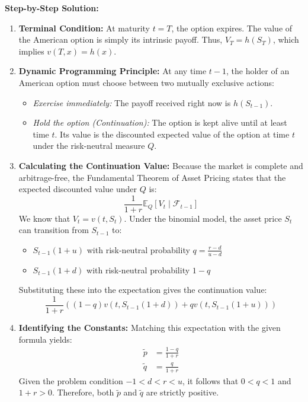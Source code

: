 \textbf{Step-by-Step Solution:}
\begin{enumerate}
    \item \textbf{Terminal Condition:} At maturity $t=T$, the option expires. The value of the American option is simply its intrinsic payoff. Thus, $V_T = h(S_T)$, which implies $v(T, x) = h(x)$.
    
    \item \textbf{Dynamic Programming Principle:} At any time $t-1$, the holder of an American option must choose between two mutually exclusive actions:
    \begin{itemize}
        \item \textit{Exercise immediately:} The payoff received right now is $h(S_{t-1})$.
        \item \textit{Hold the option (Continuation):} The option is kept alive until at least time $t$. Its value is the discounted expected value of the option at time $t$ under the risk-neutral measure $Q$.
    \end{itemize}
    
    \item \textbf{Calculating the Continuation Value:} Because the market is complete and arbitrage-free, the Fundamental Theorem of Asset Pricing states that the expected discounted value under $Q$ is:
    \begin{equation*}
        \frac{1}{1+r} \mathbb{E}_Q[ V_t \mid \mathcal{F}_{t-1} ]
    \end{equation*}
    We know that $V_t = v(t, S_t)$. Under the binomial model, the asset price $S_t$ can transition from $S_{t-1}$ to:
    \begin{itemize}
        \item $S_{t-1}(1+u)$ with risk-neutral probability $q = \frac{r-d}{u-d}$
        \item $S_{t-1}(1+d)$ with risk-neutral probability $1-q$
    \end{itemize}
    Substituting these into the expectation gives the continuation value:
    \begin{equation*}
        \frac{1}{1+r} \left( (1-q) v(t, S_{t-1}(1+d)) + q v(t, S_{t-1}(1+u)) \right)
    \end{equation*}
    
    \item \textbf{Identifying the Constants:} Matching this expectation with the given formula yields:
    \begin{align*}
        \tilde{p} &= \frac{1-q}{1+r} \\
        \tilde{q} &= \frac{q}{1+r}
    \end{align*}
    Given the problem condition $-1 < d < r < u$, it follows that $0 < q < 1$ and $1+r > 0$. Therefore, both $\tilde{p}$ and $\tilde{q}$ are strictly positive.
    

\end{enumerate}
